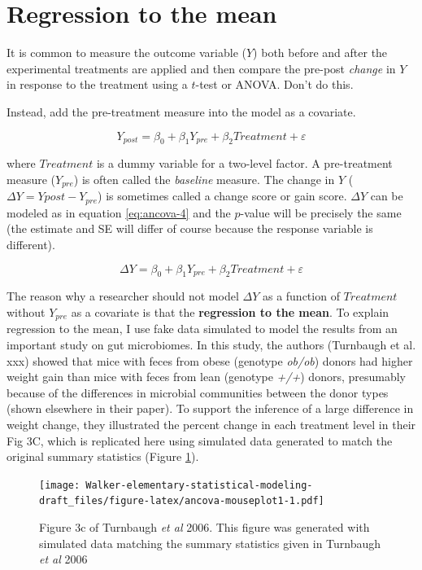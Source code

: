 \documentclass[]{book}
\begin{document}
\section{Regression to the mean}\label{regression-to-the-mean}

It is common to measure the outcome variable (\(Y\)) both before and
after the experimental treatments are applied and then compare the
pre-post \emph{change} in \(Y\) in response to the treatment using a
\(t\)-test or ANOVA. Don't do this.

Instead, add the pre-treatment measure into the model as a covariate.

\begin{equation}
Y_{post} = \beta_0 + \beta_1 Y_{pre} + \beta_2 Treatment + \varepsilon
\label{eq:ancova-4}
\end{equation}

where \(Treatment\) is a dummy variable for a two-level factor. A
pre-treatment measure (\(Y_{pre}\)) is often called the \emph{baseline}
measure. The change in \(Y\) (\(\Delta Y = Y{post} - Y_{pre}\)) is
sometimes called a change score or gain score. \(\Delta Y\) can be
modeled as in equation \eqref{eq:ancova-4} and the \(p\)-value will be
precisely the same (the estimate and SE will differ of course because
the response variable is different).

\begin{equation}
\Delta Y = \beta_0 + \beta_1 Y_{pre} + \beta_2 Treatment + \varepsilon
\label{eq:ancova-5}
\end{equation}

The reason why a researcher should not model \(\Delta Y\) as a function
of \(Treatment\) without \(Y_{pre}\) as a covariate is that the
\textbf{regression to the mean}. To explain regression to the mean, I
use fake data simulated to model the results from an important study on
gut microbiomes. In this study, the authors (Turnbaugh et al. xxx)
showed that mice with feces from obese (genotype \emph{ob/ob}) donors
had higher weight gain than mice with feces from lean (genotype
\emph{+/+}) donors, presumably because of the differences in microbial
communities between the donor types (shown elsewhere in their paper). To
support the inference of a large difference in weight change, they
illustrated the percent change in each treatment level in their Fig 3C,
which is replicated here using simulated data generated to match the
original summary statistics (Figure \ref{fig:ancova-mouseplot1}).

\begin{figure}
\centering
\texttt{[image: Walker-elementary-statistical-modeling-draft\_files/figure-latex/ancova-mouseplot1-1.pdf]}
\caption{\label{fig:ancova-mouseplot1}Figure 3c of Turnbaugh \emph{et al}
2006. This figure was generated with simulated data matching the summary
statistics given in Turnbaugh \emph{et al} 2006}
\end{figure}
\end{document}
